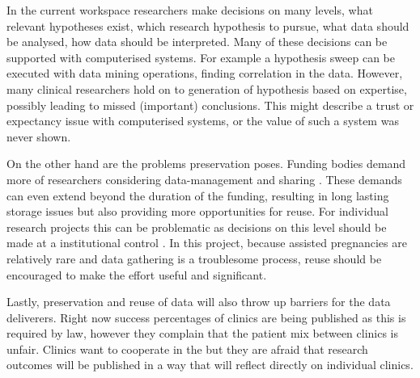 In the current workspace researchers make decisions on many levels, \eg{} what relevant hypotheses exist, which research hypothesis to pursue, what data should be analysed, how data should be interpreted.
Many of these decisions can be supported with computerised systems.
For example a hypothesis sweep can be executed with data mining operations, finding correlation in the data.
However, many clinical researchers hold on to generation of hypothesis based on expertise, possibly leading to missed (important) conclusions.
This might describe a trust or expectancy issue with computerised systems, or the value of such a system was never shown.

On the other hand are the problems preservation poses.
Funding bodies demand more of researchers considering data-management and sharing \cite{dsb3lynch}.
These demands can even extend beyond the duration of the funding, resulting in long lasting storage issues but also providing more opportunities for reuse.
For individual research projects this can be problematic as decisions on this level should be made at a institutional control \cite{dsb3lynch}.
In this project, because assisted pregnancies are relatively rare and data gathering is a troublesome process, reuse should be encouraged to make the effort useful and significant.

Lastly, preservation and reuse of data will also throw up barriers for the data deliverers.
Right now success percentages of clinics are being published as this is required by law, however they complain that the patient mix between clinics is unfair.
Clinics want to cooperate in the \project{} but they are afraid that research outcomes will be published in a way that will reflect directly on individual clinics.


